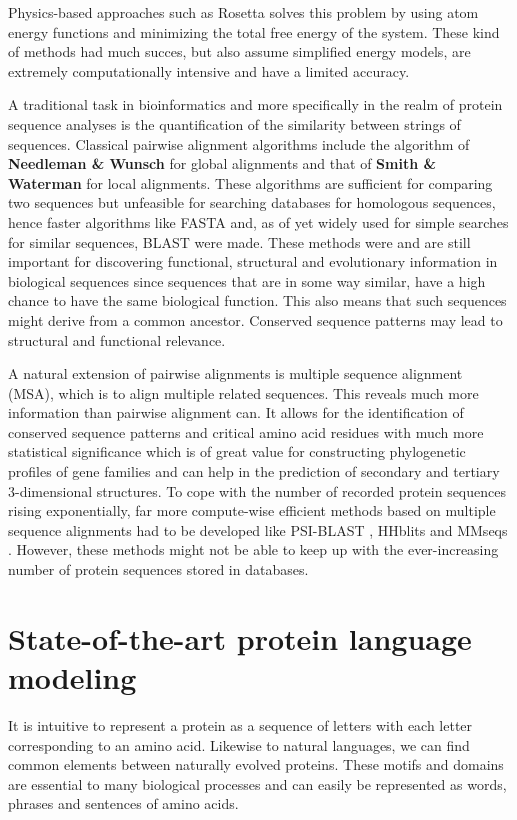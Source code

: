 Physics-based approaches such as Rosetta \cite{rosetta} solves this problem by using atom energy functions and minimizing the total free energy of the system. These kind of methods had much succes, but also assume simplified energy models, are extremely computationally intensive and have a limited accuracy.\cite{review}

A traditional task in bioinformatics and more specifically in the realm of protein sequence analyses is the quantification of the similarity between strings of sequences. Classical pairwise alignment algorithms include the algorithm of \textbf{Needleman \& Wunsch} \cite{global} for global alignments and that of \textbf{Smith \& Waterman} \cite{local} for local alignments. These algorithms are sufficient for comparing two sequences but unfeasible for searching databases for homologous sequences, hence faster algorithms like FASTA \cite{fasta} and, as of yet widely used for simple searches for similar sequences, BLAST \cite{blast} were made. These methods were and are still important for discovering functional, structural and evolutionary information in biological sequences since sequences that are in some way similar, have a high chance to have the same biological function. This also means that such sequences might derive from a common ancestor. Conserved sequence patterns may lead to structural and functional relevance. 

A natural extension of pairwise alignments is multiple sequence alignment (MSA), which is to align multiple related sequences. This reveals much more information than pairwise alignment can. It allows for the identification of conserved sequence patterns and critical amino acid residues with much more statistical significance which is of great value for constructing phylogenetic profiles of gene families and can help in the prediction of secondary and tertiary 3-dimensional structures. To cope with the number of recorded protein sequences rising exponentially, far more compute-wise efficient methods based on multiple sequence alignments had to be developed like PSI-BLAST \cite{psiblast}, HHblits \cite{hhblits3} and MMseqs \cite{mmseqs2}. However, these methods might not be able to keep up with the ever-increasing number of protein sequences stored in databases.

\section{State-of-the-art protein language modeling}
It is intuitive to represent a protein as a sequence of letters with each letter corresponding to an amino acid. Likewise to natural languages, we can find common elements between naturally evolved proteins. These motifs and domains are essential to many biological processes and can easily be represented as words, phrases and sentences of amino acids.